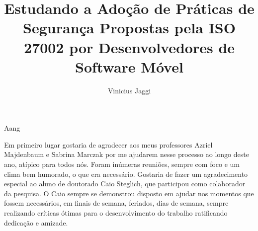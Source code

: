 \documentclass[portuguese,oneside]{tcc}
\author{Vinicius Jaggi}
\title{Estudando a Adoção de Práticas de Segurança Propostas pela ISO 27002 por Desenvolvedores de Software Móvel}
     {Your title in english here}
\begin{document}

        {Aang}


\begin{agradecimentos}
Em primeiro lugar gostaria de agradecer aos meus professores Azriel Majdenbaum e Sabrina Marczak por me ajudarem nesse processo ao longo deste ano, atípico para todos nós. Foram inúmeras reuniões, sempre com foco e um clima bem humorado, o que era necessário. Gostaria de fazer um agradecimento especial ao aluno de doutorado Caio Steglich, que participou como colaborador da pesquisa. O Caio sempre se demonstrou disposto em ajudar nos momentos que fossem necessários, em finais de semana, feriados, dias de semana, sempre realizando críticas ótimas para o desenvolvimento do trabalho ratificando dedicação e amizade.
\end{agradecimentos}
\end{document}
